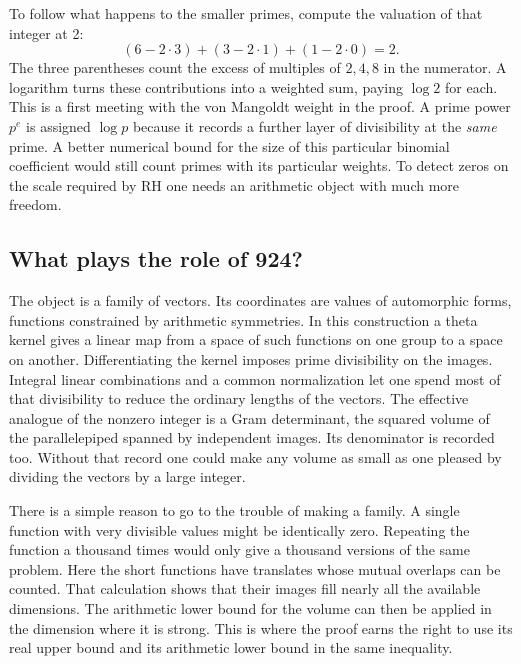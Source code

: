 \documentclass[11pt,letterpaper]{article}
\begin{document}
To follow what happens to the smaller primes, compute the valuation of that integer at 2:
\[
 (6-2\cdot3)+(3-2\cdot1)+(1-2\cdot0)=2.
\]
The three parentheses count the excess of multiples of \(2,4,8\) in the numerator. A logarithm turns these contributions into a weighted sum, paying \(\log 2\) for each. This is a first meeting with the von Mangoldt weight in the proof. A prime power \(p^e\) is assigned \(\log p\) because it records a further layer of divisibility at the \emph{same} prime. A better numerical bound for the size of this particular binomial coefficient would still count primes with its particular weights. To detect zeros on the scale required by RH one needs an arithmetic object with much more freedom.

\subsection*{What plays the role of 924?}
The object is a family of vectors. Its coordinates are values of automorphic forms, functions constrained by arithmetic symmetries. In this construction a theta kernel gives a linear map from a space of such functions on one group to a space on another. Differentiating the kernel imposes prime divisibility on the images. Integral linear combinations and a common normalization let one spend most of that divisibility to reduce the ordinary lengths of the vectors. The effective analogue of the nonzero integer is a Gram determinant, the squared volume of the parallelepiped spanned by independent images. Its denominator is recorded too. Without that record one could make any volume as small as one pleased by dividing the vectors by a large integer.

There is a simple reason to go to the trouble of making a family. A single function with very divisible values might be identically zero. Repeating the function a thousand times would only give a thousand versions of the same problem. Here the short functions have translates whose mutual overlaps can be counted. That calculation shows that their images fill nearly all the available dimensions. The arithmetic lower bound for the volume can then be applied in the dimension where it is strong. This is where the proof earns the right to use its real upper bound and its arithmetic lower bound in the same inequality.
\end{document}
